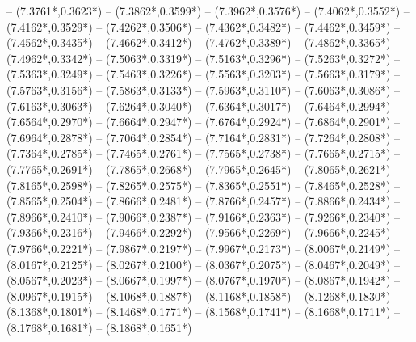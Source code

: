 {	-- ({7.3761*\dx},{0.3623*\dy})
	-- ({7.3862*\dx},{0.3599*\dy})
	-- ({7.3962*\dx},{0.3576*\dy})
	-- ({7.4062*\dx},{0.3552*\dy})
	-- ({7.4162*\dx},{0.3529*\dy})
	-- ({7.4262*\dx},{0.3506*\dy})
	-- ({7.4362*\dx},{0.3482*\dy})
	-- ({7.4462*\dx},{0.3459*\dy})
	-- ({7.4562*\dx},{0.3435*\dy})
	-- ({7.4662*\dx},{0.3412*\dy})
	-- ({7.4762*\dx},{0.3389*\dy})
	-- ({7.4862*\dx},{0.3365*\dy})
	-- ({7.4962*\dx},{0.3342*\dy})
	-- ({7.5063*\dx},{0.3319*\dy})
	-- ({7.5163*\dx},{0.3296*\dy})
	-- ({7.5263*\dx},{0.3272*\dy})
	-- ({7.5363*\dx},{0.3249*\dy})
	-- ({7.5463*\dx},{0.3226*\dy})
	-- ({7.5563*\dx},{0.3203*\dy})
	-- ({7.5663*\dx},{0.3179*\dy})
	-- ({7.5763*\dx},{0.3156*\dy})
	-- ({7.5863*\dx},{0.3133*\dy})
	-- ({7.5963*\dx},{0.3110*\dy})
	-- ({7.6063*\dx},{0.3086*\dy})
	-- ({7.6163*\dx},{0.3063*\dy})
	-- ({7.6264*\dx},{0.3040*\dy})
	-- ({7.6364*\dx},{0.3017*\dy})
	-- ({7.6464*\dx},{0.2994*\dy})
	-- ({7.6564*\dx},{0.2970*\dy})
	-- ({7.6664*\dx},{0.2947*\dy})
	-- ({7.6764*\dx},{0.2924*\dy})
	-- ({7.6864*\dx},{0.2901*\dy})
	-- ({7.6964*\dx},{0.2878*\dy})
	-- ({7.7064*\dx},{0.2854*\dy})
	-- ({7.7164*\dx},{0.2831*\dy})
	-- ({7.7264*\dx},{0.2808*\dy})
	-- ({7.7364*\dx},{0.2785*\dy})
	-- ({7.7465*\dx},{0.2761*\dy})
	-- ({7.7565*\dx},{0.2738*\dy})
	-- ({7.7665*\dx},{0.2715*\dy})
	-- ({7.7765*\dx},{0.2691*\dy})
	-- ({7.7865*\dx},{0.2668*\dy})
	-- ({7.7965*\dx},{0.2645*\dy})
	-- ({7.8065*\dx},{0.2621*\dy})
	-- ({7.8165*\dx},{0.2598*\dy})
	-- ({7.8265*\dx},{0.2575*\dy})
	-- ({7.8365*\dx},{0.2551*\dy})
	-- ({7.8465*\dx},{0.2528*\dy})
	-- ({7.8565*\dx},{0.2504*\dy})
	-- ({7.8666*\dx},{0.2481*\dy})
	-- ({7.8766*\dx},{0.2457*\dy})
	-- ({7.8866*\dx},{0.2434*\dy})
	-- ({7.8966*\dx},{0.2410*\dy})
	-- ({7.9066*\dx},{0.2387*\dy})
	-- ({7.9166*\dx},{0.2363*\dy})
	-- ({7.9266*\dx},{0.2340*\dy})
	-- ({7.9366*\dx},{0.2316*\dy})
	-- ({7.9466*\dx},{0.2292*\dy})
	-- ({7.9566*\dx},{0.2269*\dy})
	-- ({7.9666*\dx},{0.2245*\dy})
	-- ({7.9766*\dx},{0.2221*\dy})
	-- ({7.9867*\dx},{0.2197*\dy})
	-- ({7.9967*\dx},{0.2173*\dy})
	-- ({8.0067*\dx},{0.2149*\dy})
	-- ({8.0167*\dx},{0.2125*\dy})
	-- ({8.0267*\dx},{0.2100*\dy})
	-- ({8.0367*\dx},{0.2075*\dy})
	-- ({8.0467*\dx},{0.2049*\dy})
	-- ({8.0567*\dx},{0.2023*\dy})
	-- ({8.0667*\dx},{0.1997*\dy})
	-- ({8.0767*\dx},{0.1970*\dy})
	-- ({8.0867*\dx},{0.1942*\dy})
	-- ({8.0967*\dx},{0.1915*\dy})
	-- ({8.1068*\dx},{0.1887*\dy})
	-- ({8.1168*\dx},{0.1858*\dy})
	-- ({8.1268*\dx},{0.1830*\dy})
	-- ({8.1368*\dx},{0.1801*\dy})
	-- ({8.1468*\dx},{0.1771*\dy})
	-- ({8.1568*\dx},{0.1741*\dy})
	-- ({8.1668*\dx},{0.1711*\dy})
	-- ({8.1768*\dx},{0.1681*\dy})
	-- ({8.1868*\dx},{0.1651*\dy})
}
